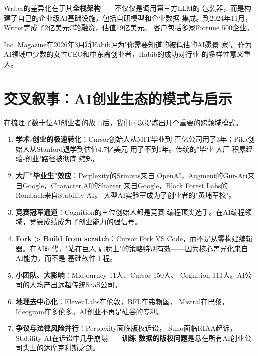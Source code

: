 Writer的差异化在于其\textbf{全栈架构}——不仅仅是调用第三方LLM的
包装器，而是构建了自己的企业级AI基础设施，包括自研模型和企业数据
集成。到2024年11月，Writer完成了2亿美元C轮融资，估值19亿美元。
客户包括多家Fortune 500企业。

Inc. Magazine在2026年3月将Habib评为"你需要知道的被低估的AI愿景
家"。作为AI领域中少数的女性CEO和中东裔创业者，Habib的成功对行业
的多样性意义重大。


\section{交叉叙事：AI创业生态的模式与启示}
\label{sec:founders-patterns}

在梳理了数十位AI创业者的故事后，我们可以提炼出几个重要的跨领域模式。

\begin{corebox}[AI 创业者的七个共性模式]
\begin{enumerate}
  \item \textbf{学术-创业的极速转化}：Cursor创始人从MIT毕业到
    百亿公司用了3年；Pika创始人从Stanford退学到估值4.7亿美元
    用了不到1年。传统的"毕业-大厂-积累经验-创业"路径被彻底
    缩短。
  \item \textbf{大厂"毕业生"效应}：Perplexity的Srinivas来自
    OpenAI，Augment的Gur-Ari来自Google，Character.AI的Shazeer
    来自Google，Black Forest Labs的Rombach来自Stability AI。
    大型AI实验室成为了创业者的"黄埔军校"。
  \item \textbf{竞赛冠军通道}：Cognition的三位创始人都是竞赛
    编程顶尖选手。在AI编程领域，竞赛成绩成为了创业能力的强信号。
  \item \textbf{Fork \textgreater{} Build from scratch}：Cursor
    Fork VS Code，而不是从零构建编辑器。在AI时代，"站在巨人
    肩膀上"的策略特别有效——因为核心差异化来自AI能力，而不是
    基础软件工程。
  \item \textbf{小团队、大影响}：Midjourney 11人、Cursor 150人、
    Cognition 111人。AI公司的人均产出远超传统SaaS公司。
  \item \textbf{地理去中心化}：ElevenLabs在伦敦，BFL在弗赖堡，
    Mistral在巴黎，Ideogram在多伦多。AI创业不再是硅谷的专利。
  \item \textbf{争议与法律风险并行}：Perplexity面临版权诉讼，
    Suno面临RIAA起诉，Stability AI在诉讼中几乎崩塌——\textbf{训练
    数据的版权问题}是悬在所有AI创业公司头上的达摩克利斯之剑。
\end{enumerate}
\end{corebox}

